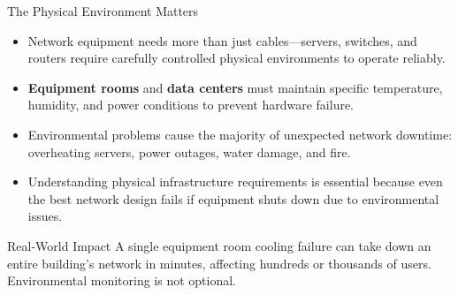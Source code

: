 \documentclass[aspectratio=169]{beamer}
\begin{document}
\begin{frame}{The Physical Environment Matters}
    \begin{itemize}
        \item Network equipment needs more than just cables---servers, switches, and routers require carefully controlled physical environments to operate reliably.
        \item \textbf{Equipment rooms} and \textbf{data centers} must maintain specific temperature, humidity, and power conditions to prevent hardware failure.
        \item Environmental problems cause the majority of unexpected network downtime: overheating servers, power outages, water damage, and fire.
        \item Understanding physical infrastructure requirements is essential because even the best network design fails if equipment shuts down due to environmental issues.
    \end{itemize}
    
    \vspace{0.3cm}
    \begin{alertblock}{Real-World Impact}
        A single equipment room cooling failure can take down an entire building's network in minutes, affecting hundreds or thousands of users. Environmental monitoring is not optional.
    \end{alertblock}
\end{frame}
\end{document}
